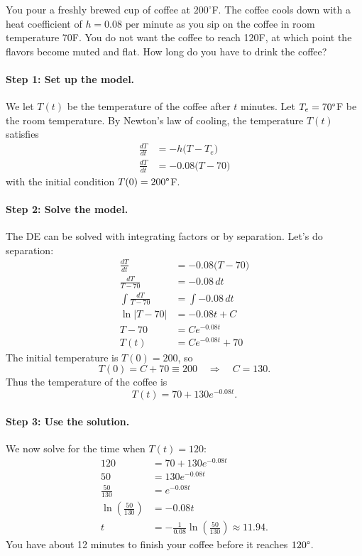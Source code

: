 \documentclass[09pt,letterpaper]{article}
\begin{document}
\begin{example}[1]{    
You pour a freshly brewed cup of coffee at $200^\circ$F.
The coffee cools down with a heat coefficient of $h=0.08$ per minute as you sip on the coffee in room temperature  70\degree F. You do not want the coffee to reach 120\degree F, at which point the flavors become muted and flat. How long do you have to drink the coffee? 
}

\paragraph{Step 1: Set up the model.} We let $T(t)$ be the temperature of the coffee after $t$ minutes. Let $T_e=70\degree$F be the room temperature. By Newton’s law of cooling, the temperature $T(t)$ satisfies
\[
\begin{aligned}
\frac{dT}{dt} &= -h\bigl(T - T_e\bigr)\\
\frac{dT}{dt} &= -0.08\bigl(T - 70\bigr)
\end{aligned}
\]
with the initial condition $T(0)=200\degree$F. 
\paragraph{Step 2: Solve the model.} The DE can be solved with integrating factors or by separation. Let's do separation:
\begin{align*}
\frac{dT}{dt} &= -0.08\bigl(T - 70\bigr)\\
\frac{dT}{T - 70} &= -0.08\,dt\\    
\int \frac{dT}{T - 70} &= \int -0.08\,dt\\
\ln|T - 70| &= -0.08t + C\\
T-70 &= Ce^{-0.08t}\\
T(t)&= Ce^{-0.08t}+70
\end{align*}
The initial temperature is $T(0)=200$, so
\[
T(0) =  C +70 \equiv 200\quad \Rightarrow \quad C = 130.
\]
Thus the temperature of the coffee is 
\[
\boxed{
T(t) = 70 + 130e^{-0.08t}.
}
\]
\paragraph{Step 3: Use the solution.}
We now solve for the time when $T(t)=120$:
\begin{align*}
120 &= 70 + 130e^{-0.08t} \\
50 &= 130e^{-0.08t} \\
\frac{50}{130} &= e^{-0.08t} \\
\ln\!\left(\frac{50}{130}\right) &= -0.08t \\
t &= -\frac{1}{0.08}\ln\!\left(\frac{50}{130}\right) \approx 11.94.
\end{align*}
You have about 12 minutes to finish your coffee before it reaches $120\degree$.
\end{example}
\end{document}
